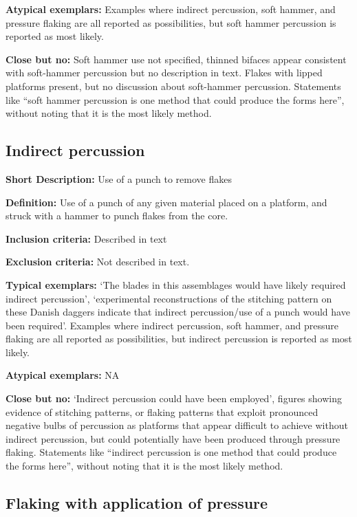 \documentclass[
]{article}
\begin{document}
\textbf{Atypical exemplars:} Examples where indirect percussion, soft
hammer, and pressure flaking are all reported as possibilities, but soft
hammer percussion is reported as most likely.

\textbf{Close but no:} Soft hammer use not specified, thinned bifaces
appear consistent with soft-hammer percussion but no description in
text. Flakes with lipped platforms present, but no discussion about
soft-hammer percussion. Statements like ``soft hammer percussion is one
method that could produce the forms here'', without noting that it is
the most likely method.

\hypertarget{indirect-percussion}{%
\subsection{Indirect percussion}\label{indirect-percussion}}

\textbf{Short Description:} Use of a punch to remove flakes

\textbf{Definition:} Use of a punch of any given material placed on a
platform, and struck with a hammer to punch flakes from the core.

\textbf{Inclusion criteria:} Described in text

\textbf{Exclusion criteria:} Not described in text.

\textbf{Typical exemplars:} `The blades in this assemblages would have
likely required indirect percussion', `experimental reconstructions of
the stitching pattern on these Danish daggers indicate that indirect
percussion/use of a punch would have been required'. Examples where
indirect percussion, soft hammer, and pressure flaking are all reported
as possibilities, but indirect percussion is reported as most likely.

\textbf{Atypical exemplars:} NA

\textbf{Close but no:} `Indirect percussion could have been employed',
figures showing evidence of stitching patterns, or flaking patterns that
exploit pronounced negative bulbs of percussion as platforms that appear
difficult to achieve without indirect percussion, but could potentially
have been produced through pressure flaking. Statements like ``indirect
percussion is one method that could produce the forms here'', without
noting that it is the most likely method.

\hypertarget{flaking-with-application-of-pressure}{%
\subsection{Flaking with application of
pressure}\label{flaking-with-application-of-pressure}}
\end{document}
